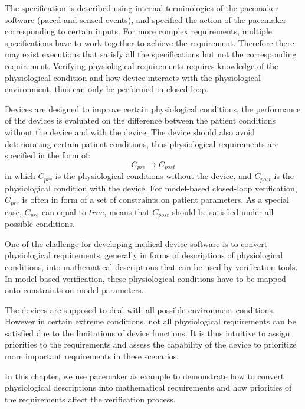 The specification is described using internal terminologies of the pacemaker software (paced and sensed events), and specified the action of the pacemaker corresponding to certain inputs. For more complex requirements, multiple specifications have to work together to achieve the requirement. Therefore there may exist executions that satisfy all the specifications but not the corresponding requirement. Verifying physiological requirements requires knowledge of the physiological condition and how device interacts with the physiological environment, thus can only be performed in closed-loop. 

Devices are designed to improve certain physiological conditions, the performance of the devices is evaluated on the difference between the patient conditions without the device and with the device. The device should also avoid deteriorating certain patient conditions, thus physiological requirements are specified in the form of:
$$C_{pre}\rightarrow C_{post}$$
in which $C_{pre}$ is the physiological conditions without the device,  and $C_{post}$ is the physiological condition with the device. For model-based closed-loop verification, $C_{pre}$ is often in form of a set of constraints on patient parameters. As a special case, $C_{pre}$ can equal to $true$, means that $C_{post}$ should be satisfied under all possible conditions.

One of the challenge for developing medical device software is to convert physiological requirements, generally in forms of descriptions of physiological conditions, into mathematical descriptions that can be used by verification tools.  In model-based verification, these physiological conditions have to be mapped onto constraints on model parameters. %

The devices are supposed to deal with all possible environment conditions. However in certain extreme conditions, not all physiological requirements can be satisfied due to the limitations of device functions. It is thus intuitive to assign priorities to the requirements and assess the capability of the device to prioritize more important requirements in these scenarios. 

In this chapter, we use pacemaker as example to demonstrate how to convert physiological descriptions into mathematical requirements and how priorities of the requirements affect the verification process.


